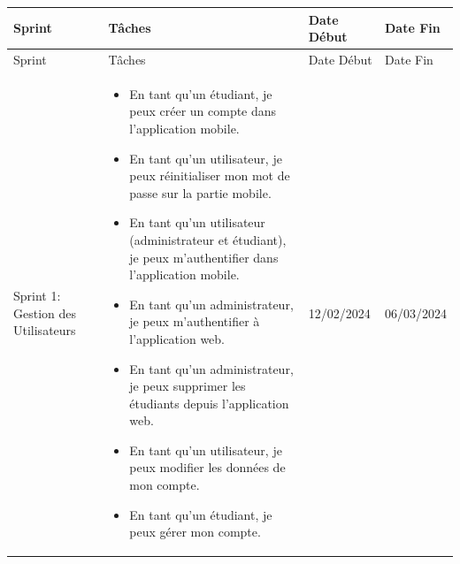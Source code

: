 \begin{sloppypar}
\vspace{-2cm}
\small
\begin{center}
\begin{longtable}{|>{\raggedright}p{2.8cm}|>{\raggedright}p{8cm}|>{\raggedright\arraybackslash\small}p{1.9cm}|>{\raggedright\arraybackslash\small}p{1.8cm}|}

\hline
\textbf{Sprint} & \textbf{Tâches} & 
\textbf{Date Début} & \textbf{Date Fin} \\
\hline

\endfirsthead
\hline
Sprint & Tâches & Date Début & Date Fin \\
\hline
\endhead
Sprint 1: Gestion des Utilisateurs & 
\begin{itemize}
    \vspace{-0.8cm}
    \setlength{\leftskip}{-0.4cm}
    \item En tant qu’un étudiant, je peux créer un compte dans l’application mobile.
    \vspace{-0.2cm}
    \item En tant qu’un utilisateur, je peux réinitialiser mon mot de passe sur la partie mobile.
        \vspace{-0.2cm}
    \item En tant qu’un utilisateur (administrateur et étudiant), je peux m’authentifier dans l’application mobile.
        \vspace{-0.2cm}
    \item En tant qu’un administrateur, je peux m’authentifier à l’application web.
        \vspace{-0.2cm}
    \item En tant qu’un administrateur, je peux supprimer les étudiants depuis l’application web.
        \vspace{-0.2cm}
    \item En tant qu’un utilisateur, je peux modifier les données de mon compte.
        \vspace{-0.2cm}
    \item En tant qu’un étudiant, je peux gérer mon compte.
    
\end{itemize}
& 12/02/2024 & 06/03/2024 \\
\hline


\end{longtable}
\end{center}
\end{sloppypar}
